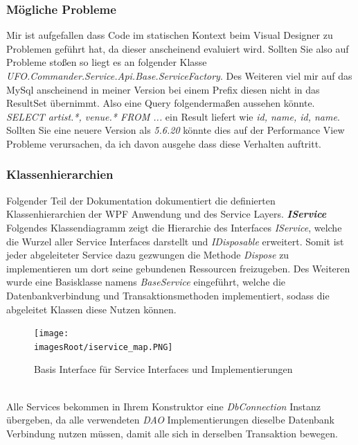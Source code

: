 \documentclass[11pt, a4paper, twoside]{article}   	%
\newcommand{\imagesRoot}{images}
\begin{document}
\subsubsection{Mögliche Probleme}
Mir ist aufgefallen dass Code im statischen Kontext beim Visual Designer zu Problemen geführt hat, da dieser anscheinend evaluiert wird. Sollten Sie also auf Probleme stoßen so liegt es an folgender Klasse \emph{UFO.Commander.Service.Api.Base.ServiceFactory}.
\newline\newline
Des Weiteren viel mir auf das MySql anscheinend in meiner Version bei einem Prefix diesen nicht in das ResultSet übernimmt. Also eine Query folgendermaßen aussehen könnte.\newline
\emph{SELECT artist.*, venue.* FROM ...} ein Result liefert wie \emph{id, name, id, name}. Sollten Sie eine neuere Version als \emph{5.6.20} könnte dies auf der Performance View Probleme verursachen, da ich davon ausgehe dass diese Verhalten auftritt. 
\subsubsection{Klassenhierarchien}
Folgender Teil der Dokumentation dokumentiert die definierten Klassenhierarchien der WPF Anwendung und des Service Layers.
\newpage
\emph{\textbf{IService}}\\
Folgendes Klassendiagramm zeigt die Hierarchie des Interfaces \emph{IService}, welche die Wurzel aller Service Interfaces darstellt und \emph{IDisposable} erweitert. Somit ist jeder abgeleiteter Service dazu gezwungen die Methode \emph{Dispose} zu implementieren um dort seine gebundenen Ressourcen freizugeben. Des Weiteren wurde eine Basisklasse namens \emph{BaseService} eingeführt, welche die Datenbankverbindung und Transaktionsmethoden implementiert, sodass die abgeleitet Klassen diese Nutzen können.
\begin{figure}[h]
	\centering
	\texttt{[image: \\imagesRoot/iservice\_map.PNG]}
	\caption
	{Basis Interface für Service Interfaces und Implementierungen}
\end{figure}
\ \\
Alle Services bekommen in Ihrem Konstruktor eine \emph{DbConnection} Instanz übergeben, da alle verwendeten \emph{DAO} Implementierungen dieselbe Datenbank Verbindung nutzen müssen, damit alle sich in derselben Transaktion bewegen.
\end{document}
